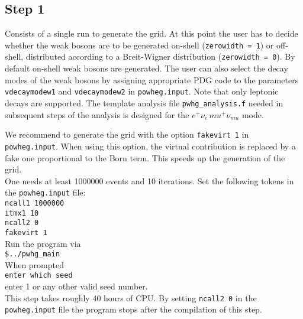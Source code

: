 \documentclass[a4paper,11pt]{article}
\begin{document}
\subsection*{Step 1}
%
Consists of a single run to generate the grid. At this point the user
has to decide whether the weak bosons are to be generated on-shell
({\tt zerowidth = 1}) or off-shell, distributed according to a
Breit-Wigner distribution ({\tt zerowidth = 0}).  By default on-shell
weak bosons are generated. The user can also select the decay modes of
the weak bosons by assigning appropriate PDG code to the parameters
{\tt vdecaymodew1} and {\tt vdecaymodew2} in {\tt powheg.input}. Note
that only leptonic decays are supported. The template analysis file
{\tt pwhg\_analysis.f} needed in subsequent steps of the analysis is
designed for the $e^+\nu_e \,mu^+\nu_{mu}$ mode.

We recommend to generate the grid with the option {\tt fakevirt 1} in
{\tt powheg.input}. When using this option, the virtual contribution
is replaced by a fake one proportional to the Born term. This speeds
up the generation of the grid.
\\[2ex]
One needs at least 1000000 events and 10 iterations. Set the following
tokens in the {\tt powheg.input} file:
\\[2ex]
{\tt ncall1 1000000
  \\[2ex]
  itmx1 10
  \\[2ex]
  ncall2 0
  \\[2ex]
  fakevirt 1 }
\\[2ex]
Run the program via
\\[2ex]
{\tt \$../pwhg\_main}
\\[2ex]
When prompted
\\[2ex]
{\tt enter which seed}
\\[2ex]
enter 1 or any other valid seed number.
\\[2ex]
This step takes roughly 40 hours of CPU. By setting {\tt ncall2 0} in
the {\tt powheg.input} file the program stops after the compilation of
this step.

\end{document}
